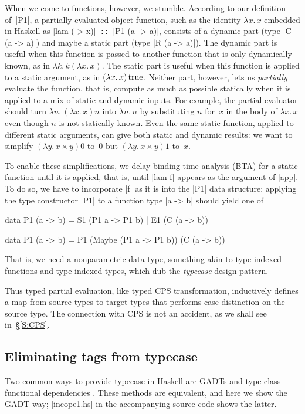 \documentclass[preprint]{sigplanconf}
\newcommand{\fun}[1]{\mathopen{\lambda\mathord{#1}.\,}}
\newcommand{\True}{\mathinner{\mathrm{true}}}
\begin{document}
When we come to functions, however, we stumble.  According to our
definition of~|P1|, a partially evaluated object function, such as the
identity $\fun{x}x$ embedded in Haskell as |lam (\x -> x)|\texttt{ ::
}|P1 (a -> a)|, consists of a dynamic part (type |C (a -> a)|) and
maybe a static part (type |R (a -> a)|).  The dynamic part is useful
when this function is passed to another function that is only
dynamically known, as in $\fun{k}k(\fun{x}x)$.  The static part is
useful when this function is applied to a static argument, as in
$(\fun{x}x)\True$.  Neither part, however, lets us \emph{partially}
evaluate the function, that is, compute as much as possible statically
when it is applied to a mix of static and dynamic inputs.  For example,
the partial evaluator should turn $\fun{n}(\fun{x}x)n$ into $\fun{n}n$
by substituting $n$ for~$x$ in the body of $\fun{x}x$ even though $n$ is
not statically known.  Even the same static function, applied to
different static arguments, can give both static and dynamic results: we
want to simplify $(\fun{y}x\times y)0$ to~$0$ but $(\fun{y}x\times y)1$
to~$x$.

To enable these simplifications, we delay binding-time analysis (BTA)
for a static function until it is applied, that is, until |lam f|
appears as the argument of |app|.  To do so, we have to incorporate |f|
as it is into the |P1| data structure: applying the type constructor
|P1| to a function type |a -> b| should yield one of
\begin{code}
data P1 (a -> b) = S1 (P1 a -> P1 b)
                 | E1 (C (a -> b))

data P1 (a -> b) = P1 (Maybe (P1 a -> P1 b))
                      (C (a -> b))
\end{code}
That is, we need a nonparametric data type, something akin to
type-indexed functions and type-indexed types, which
\citet{oliveira-typecase} dub the \emph{typecase} design pattern.

Thus typed partial evaluation, like typed CPS transformation,
inductively defines a map from source types to target types that
performs case distinction on the source type.  The connection with CPS
is not an accident, as we shall see in~\S\ref{S:CPS}.

\subsection{Eliminating tags from typecase}
\label{S:PE-GADT}

Two common ways to provide typecase in Haskell are
GADTs and type-class functional dependencies
\citep{oliveira-typecase}.  These
methods are equivalent, and here we show the GADT way; |incope1.hs|
in the accompanying source code shows the latter.
\end{document}
